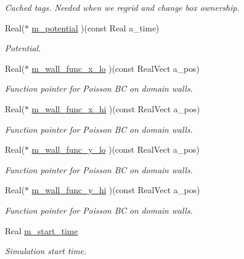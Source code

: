 \begin{DoxyCompactItemize}
\begin{DoxyCompactList}\small\item\em Cached tags. Needed when we regrid and change box ownership. \end{DoxyCompactList}\item 
Real($\ast$ \hyperlink{classplasma__engine_ae28be73a1922c65e933ef0b616444991}{m\+\_\+potential} )(const Real a\+\_\+time)
\begin{DoxyCompactList}\small\item\em Potential. \end{DoxyCompactList}\item 
Real($\ast$ \hyperlink{classplasma__engine_a65dc20ba9e36ce880f4992012280ca06}{m\+\_\+wall\+\_\+func\+\_\+x\+\_\+lo} )(const Real\+Vect a\+\_\+pos)
\begin{DoxyCompactList}\small\item\em Function pointer for Poisson BC on domain walls. \end{DoxyCompactList}\item 
Real($\ast$ \hyperlink{classplasma__engine_a76d3c3e77919786c165e39dafd4b3779}{m\+\_\+wall\+\_\+func\+\_\+x\+\_\+hi} )(const Real\+Vect a\+\_\+pos)
\begin{DoxyCompactList}\small\item\em Function pointer for Poisson BC on domain walls. \end{DoxyCompactList}\item 
Real($\ast$ \hyperlink{classplasma__engine_a738cb5077366493ba56b7e5f7359d695}{m\+\_\+wall\+\_\+func\+\_\+y\+\_\+lo} )(const Real\+Vect a\+\_\+pos)
\begin{DoxyCompactList}\small\item\em Function pointer for Poisson BC on domain walls. \end{DoxyCompactList}\item 
Real($\ast$ \hyperlink{classplasma__engine_a6378af218871a41120b3ffd3b13b13eb}{m\+\_\+wall\+\_\+func\+\_\+y\+\_\+hi} )(const Real\+Vect a\+\_\+pos)
\begin{DoxyCompactList}\small\item\em Function pointer for Poisson BC on domain walls. \end{DoxyCompactList}\item 
Real \hyperlink{classplasma__engine_a8f99fe79d7b66c655eb11ed3fdac5e2b}{m\+\_\+start\+\_\+time}
\begin{DoxyCompactList}\small\item\em Simulation start time. \end{DoxyCompactList}\item 

\end{DoxyCompactItemize}
